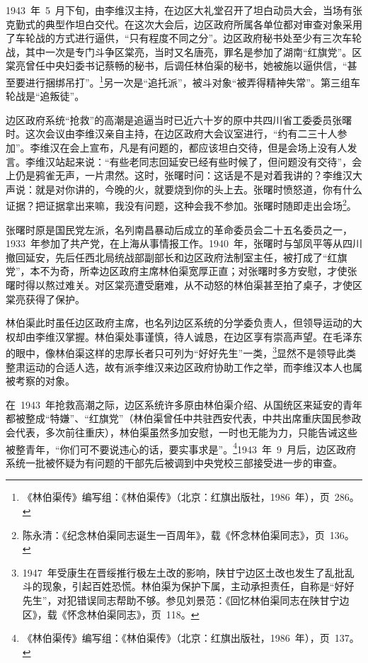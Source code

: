 1943~年~5~月下旬，由李维汉主持，在边区大礼堂召开了坦白动员大会，当场有张克勤式的典型作坦白交代。在这次大会后，边区政府所属各单位都对审查对象采用了车轮战的方式进行逼供，“只有程度不同之分”。边区政府秘书处至少有三次车轮战，其中一次是专门斗争区棠亮，当时又名唐亮，罪名是参加了湖南“红旗党”。区棠亮曾任中央妇委书记蔡畅的秘书，后调任林伯渠的秘书，她被施以逼供信，“甚至要进行捆绑吊打”。\footnote{《林伯渠传》编写组：《林伯渠传》（北京：红旗出版社，1986~年），页~286。}另一次是“追托派”，被斗对象“被弄得精神失常”。第三组车轮战是“追叛徒”。

边区政府系统“抢救”的高潮是追逼当时已近六十岁的原中共四川省工委委员张曙时。这次会议由李维汉亲自主持，在边区政府大会议室进行，“约有二三十人参加”。李维汉在会上宣布，凡是有问题的，都应该坦白交待，但是会场上没有人发言。李维汉站起来说：“有些老同志回延安已经有些时候了，但问题没有交待”，会上仍是鸦雀无声，一片肃然。这时，张曙时问：这话是不是对着我讲的？李维汉大声说：就是对你讲的，今晚的火，就要烧到你的头上去。张曙时愤怒道，你有什么证据？把证据拿出来嘛，我没有问题，这种会我不参加。张曙时随即走出会场\footnote{陈永清：《纪念林伯渠同志诞生一百周年》，载《怀念林伯渠同志》，页~136。}。

张曙时原是国民党左派，名列南昌暴动后成立的革命委员会二十五名委员之一，1933~年参加了共产党，在上海从事情报工作。1940~年，张曙时与邹凤平等从四川撤回延安，先后任西北局统战部副部长和边区政府法制室主任，被打成了“红旗党”，本不为奇，所幸边区政府主席林伯渠宽厚正直；对张曙时多方安慰，才使张曙时得以熬过难关。对区棠亮遭受磨难，从不动怒的林伯渠甚至拍了桌子，才使区棠亮获得了保护。

林伯渠此时虽任边区政府主席，也名列边区系统的分学委负责人，但领导运动的大权却由李维汉掌握。林伯渠处事谨慎，待人诚恳，在边区享有崇高声望。在毛泽东的眼中，像林伯渠这样的忠厚长者只可列为“好好先生”一类，\footnote{1947~年受康生在晋绥推行极左土改的影响，陕甘宁边区土改也发生了乱批乱斗的现象，引起百姓恐慌。林伯渠为保护下属，主动承担责任，自称是“好好先生”，对犯错误同志帮助不够。参见刘景范：《回忆林伯渠同志在陕甘宁边区》，载《怀念林伯渠同志》，页~118。}显然不是领导此类整肃运动的合适人选，故有派李维汉来边区政府协助工作之举，而李维汉本人也属被考察的对象。

在~1943~年抢救高潮之际，边区系统许多原由林伯渠介绍、从国统区来延安的青年都被整成“特嫌”、“红旗党”（林伯渠曾任中共驻西安代表，中共出席重庆国民参政会代表，多次前往重庆），林伯渠虽然多加安慰，一时也无能为力，只能告诫这些被整青年，“你们可不要说违心的话，要实事求是”。\footnote{《林伯渠传》编写组：《林伯渠传》（北京：红旗出版社，1986~年），页~137。}1943~年~9~月后，边区政府系统一批被怀疑为有问题的干部先后被调到中央党校三部接受进一步的审查。


